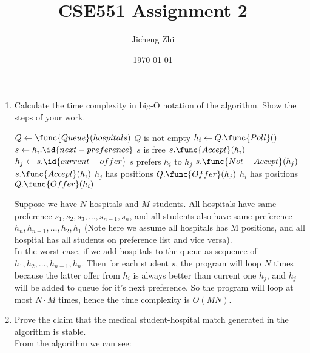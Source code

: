 \documentclass[14pt, a4paper]{article}
\title{CSE551 Assignment 2}
\author{Jicheng Zhi}
\date{\today}
\begin{document}
\maketitle

\begin{enumerate}

\newcommand{\qonefunc}{\frac{n^2}{8} - 10n - 4}
\item Calculate the time complexity in big-O notation of the algorithm. Show the steps of your work.\\

\begin{codebox}
\li $Q \gets \func{Queue}(hospitals)$
\li \While $Q$ is not empty
\li \Do $h_i \gets Q.\func{Poll}()$
\li     $s \gets h_i.\id{next-preference}$
\li     \If $s$ is free
\li     \Then $s.\func{Accept}(h_i)$
\li     \Else 
\li         $h_j \gets s.\id{current-offer}$ 
\li         \If $s$ prefers $h_i$ to $h_j$
\li         \Then $s.\func{Not-Accept}(h_j)$
\li             $s.\func{Accept}(h_i)$
\li             \If $h_j$ has positions
\li             \Then $Q.\func{Offer}(h_j)$
                \End
            \End
        \End
\li     \If $h_i$ has positions
\li     \Then $Q.\func{Offer}(h_i)$
        \End
    \End\\
\end{codebox}

Suppose we have $N$ hospitals and $M$ students. All hospitals have same preference 
$s_1, s_2, s_3, \hdots, s_{n-1}, s_n$, and all students also have same preference 
$h_n, h_{n-1}, \hdots, h_2, h_1$ 
(Note here we assume all hospitals has M positions, 
and all hospital has all students on preference list and vice versa). \\

In the worst case, 
if we add hospitals to the queue as sequence of \\
$h_1, h_2, \hdots, h_{n-1}, h_n$. 
Then for each student $s$, the program will loop $N$ times 
because the latter offer from $h_i$ is always better than current one $h_j$, 
and $h_j$ will be added to queue for it's next preference. 
So the program will loop at most $N \cdot M$ times, 
hence the time complexity is $O(MN)$.

\item Prove the claim that the medical student-hospital match generated in the algorithm is stable. \\

From the algorithm we can see: 


\end{enumerate}
\end{document}
